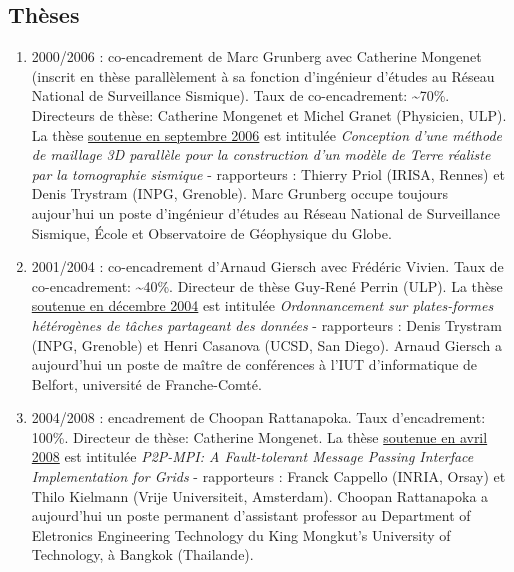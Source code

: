 \subsection{Thèses}
\begin{enumerate}

\item 2000/2006 : co-encadrement de Marc Grunberg avec Catherine Mongenet 
(inscrit en thèse parallèlement à sa fonction d'ingénieur d'études au Réseau National de Surveillance Sismique). 
Taux de co-encadrement: \~{}70\%.
Directeurs de thèse: Catherine Mongenet et Michel Granet (Physicien, ULP).
La thèse \underline{soutenue en septembre 2006} est intitulée \textit{Conception d'une méthode de maillage 3D parallèle pour la construction d'un modèle de Terre réaliste par la tomographie sismique} - rapporteurs : Thierry Priol (IRISA, Rennes) et Denis Trystram (INPG, Grenoble).
Marc Grunberg occupe toujours aujour'hui un poste d'ingénieur d'études au Réseau National de Surveillance Sismique, 
\'{E}cole et Observatoire de Géophysique du Globe.\\

\item 2001/2004 : co-encadrement d'Arnaud Giersch avec Frédéric Vivien. Taux de co-encadrement: \~{}40\%.
Directeur de thèse Guy-René Perrin (ULP).
La thèse \underline{soutenue en décembre 2004} est intitulée \textit{Ordonnancement sur plates-formes hétérogènes de tâches partageant des données} - rapporteurs : Denis Trystram (INPG, Grenoble) et Henri Casanova (UCSD, San Diego).
Arnaud Giersch a aujourd'hui un poste de maître de conférences à l'IUT d'informatique de Belfort, université de Franche-Comté.\\



\item 2004/2008 : encadrement de Choopan Rattanapoka. Taux d'encadrement: 100\%. Directeur de thèse: Catherine Mongenet. 
La thèse \underline{soutenue en avril 2008} est intitulée \textit{P2P-MPI: A Fault-tolerant Message Passing Interface Implementation for Grids} - rapporteurs : Franck Cappello (INRIA, Orsay) et Thilo Kielmann (Vrije Universiteit, Amsterdam). 
Choopan Rattanapoka a aujourd'hui un poste permanent d'assistant professor au
Department of Eletronics Engineering Technology du King Mongkut's University of Technology, à Bangkok (Thailande).



\end{enumerate}

